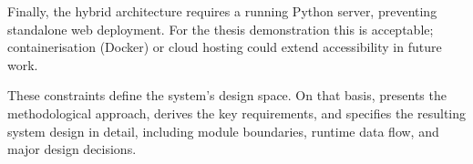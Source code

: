 Finally, the hybrid architecture requires a running Python server, preventing standalone web deployment. For the thesis demonstration this is acceptable; containerisation (Docker) or cloud hosting could extend accessibility in future work.

These constraints define the system's design space. On that basis,  presents the methodological approach, derives the key requirements, and specifies the resulting system design in detail, including module boundaries, runtime data flow, and major design decisions.

